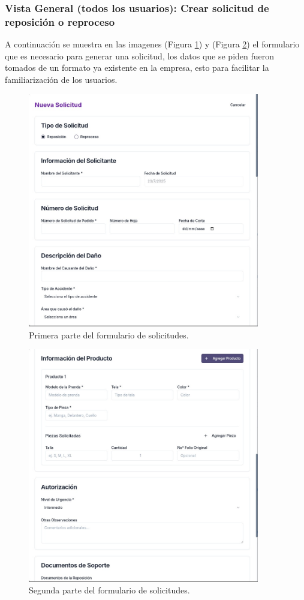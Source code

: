 \documentclass[12pt,letterpaper,spanish]{report}
\begin{document}
\subsubsection{Vista General (todos los usuarios): Crear solicitud de reposición o reproceso}
A continuación se muestra en las imagenes (Figura \ref{fig:form1}) y (Figura \ref{fig:form2}) el formulario que es necesario para generar una solicitud, los datos que se piden fueron tomados de un formato ya existente en la empresa, esto para facilitar la familiarización de los usuarios.

\begin{figure}[H]
    \centering
    \includegraphics[width=0.9\textwidth]{form_repo1.jpg}
    \caption{Primera parte del formulario de solicitudes.}
    \label{fig:form1}
\end{figure}
\begin{figure}[H]
    \centering
    \includegraphics[width=0.9\textwidth]{form_repo2.jpg}
    \caption{Segunda parte del formulario de solicitudes.}
    \label{fig:form2}
\end{figure}
\end{document}

